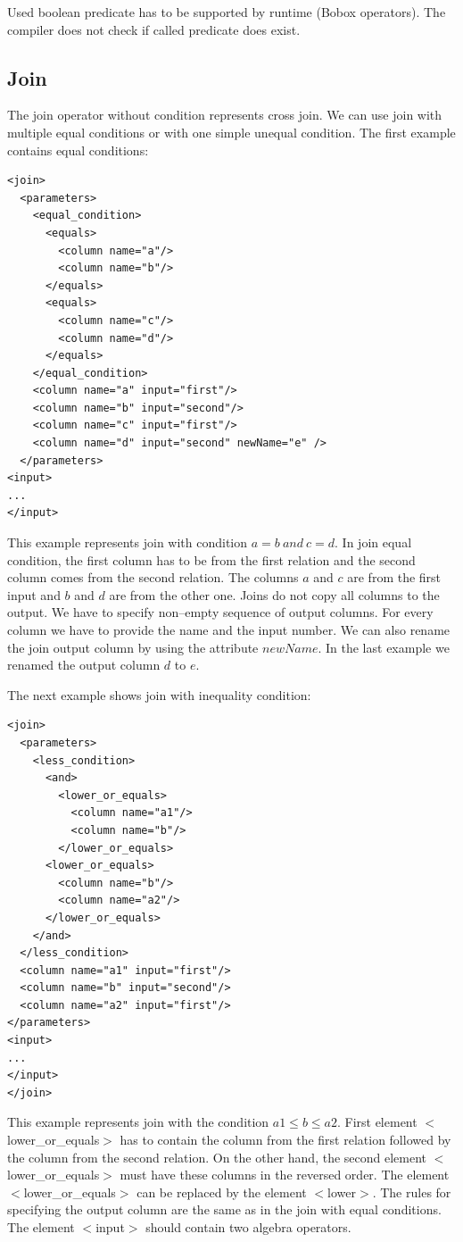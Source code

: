Used boolean predicate has to be supported by runtime (Bobox operators). The compiler does not check if called predicate does exist.

\subsection{Join}

The join operator without condition represents cross join. We can use join with multiple equal conditions or with one simple unequal condition. The first example contains equal conditions:

\begin{lstlisting}
<join>
  <parameters>
    <equal_condition>
      <equals>
        <column name="a"/>
        <column name="b"/>
      </equals>
      <equals>
        <column name="c"/>
        <column name="d"/>
      </equals>
    </equal_condition>
    <column name="a" input="first"/>
    <column name="b" input="second"/>
    <column name="c" input="first"/>
    <column name="d" input="second" newName="e" />
  </parameters>
<input>
...
</input>
\end{lstlisting}

This example represents join with condition $a=b~and~c=d$. In join equal condition, the first column has to be from the first relation and the second column comes from the second relation. The columns $a$ and $c$ are from the first input and $b$ and $d$ are from the other one. Joins do not copy all columns to the output. We have to specify non--empty sequence of output columns. For every column we have to provide the name and the input number. We can also rename the join output column by using the attribute $newName$. In the last example we renamed the output column $d$ to $e$.

The next example shows join with inequality condition:

\begin{lstlisting}
<join>
  <parameters>
    <less_condition>
      <and>
        <lower_or_equals>
          <column name="a1"/>
          <column name="b"/>
        </lower_or_equals>
      <lower_or_equals>
        <column name="b"/>
        <column name="a2"/>
      </lower_or_equals>
    </and>
  </less_condition>
  <column name="a1" input="first"/>
  <column name="b" input="second"/>
  <column name="a2" input="first"/>
</parameters>
<input>
...
</input>
</join>
\end{lstlisting}
This example represents join with the condition $a1\leq b\leq a2$. First element $<$lower\_or\_equals$>$ has to contain the column from the first relation followed by the column from the second relation. On the other hand, the second element $<$lower\_or\_equals$>$ must have these columns in the reversed order. The element $<$lower\_or\_equals$>$ can be replaced by the element $<$lower$>$. The rules for specifying the output column are the same as in the join with equal conditions. The element $<$input$>$ should contain two algebra operators.

